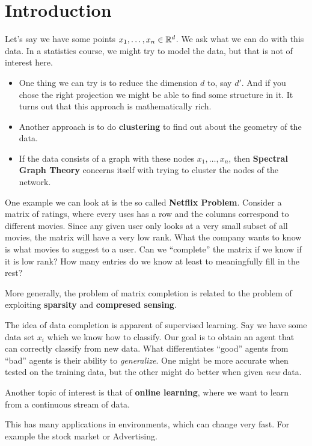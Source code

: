 \section{Introduction}

Let's say we have some points $x_{1}, \ldots, x_{n} \in \mathbb{R}^{d}$. We ask what we can do with this data.
In a statistics course, we might try to model the data, but that is not of interest here.
\begin{itemize}
  \item One thing we can try is to reduce the dimension $d$ to, say $d'$. 
    And if you chose the right projection we might be able to find some structure in it.
    It turns out that this approach is mathematically rich.
  \item Another approach is to do \textbf{clustering} to find out about the geometry of the data.
  \item If the data consists of a graph with these nodes $x_{1}, \ldots, x_{n}$, then \textbf{Spectral Graph Theory} concerns itself with trying to cluster the nodes of the network.
\end{itemize}

One example we can look at is the so called \textbf{Netflix Problem}. Consider a matrix of ratings, where every uses has a row and the columns correspond to different movies.
Since any given user only looks at a very small subset of all movies, the matrix will have a very low rank.
What the company wants to know is what movies to suggest to a user. 
Can we ``complete'' the matrix if we know if it is low rank? 
How many entries do we know at least to meaningfully fill in the rest?

More generally, the problem of matrix completion is related to the problem of exploiting \textbf{sparsity} and \textbf{compresed sensing}.

The idea of data completion is apparent of supervised learning.
Say we have some data set $x_i$ which we know how to classify. Our goal is to obtain an agent that can correctly classify from new data.
What differentiates ``good'' agents from ``bad'' agents is their ability to \emph{generalize}.
One might be more accurate when tested on the training data, but the other might do better when given \emph{new} data.

Another topic of interest is that of \textbf{online learning}, where we want to learn from a continuous stream of data.

This has many applications in environments, which can change very fast. For example the stock market or Advertising.

